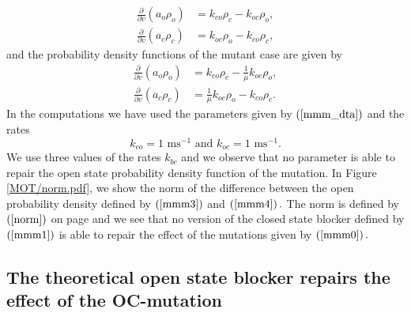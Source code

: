 \begin{align}
\frac{\partial}{\partial v}\left(  a_{o}\rho_{o}\right)   &  =k_{co}\rho
_{c}-k_{oc}\rho_{o},\label{mmm4}\\
\frac{\partial}{\partial v}\left(  a_{c}\rho_{c}\right)   &  =k_{oc}\rho
_{o}-k_{co}\rho_{c},\nonumber
\end{align}
and the probability density functions of the mutant case are given by
\begin{align}
\frac{\partial}{\partial v}\left(  a_{o}\rho_{o}\right)   &  =k_{co}\rho
_{c}-\frac{1}{\mu}k_{oc}\rho_{o},\label{mutant44}\\
\frac{\partial}{\partial v}\left(  a_{c}\rho_{c}\right)   &  =\frac{1}{\mu}k_{oc}\rho
_{o}-k_{co}\rho_{c}.\nonumber
\end{align}
In the computations we have used the parameters given by $\left(
\ref{mmm_dta}\right)  $ and the rates%
\[
k_{co}=1\text{ ms}^{-1} \text{ and }k_{oc}=1\text{ ms}^{-1}.
\]
We use three values of the rates $k_{bc}$ and we observe that no parameter is
able to repair the open state probability density function of the mutation. In
Figure \ref{MOT/norm.pdf}, we show the norm of the difference between the open probability
density defined by $\left(  \ref{mmm3}\right)  $ and $\left(  \ref{mmm4}%
\right)  .$ The norm is defined by $\left(  \ref{norm}\right)  $ on page
\pageref{norm} and we see that no version of the closed state blocker defined 
by $\left(  \ref{mmm1}\right)  $ is able to repair the effect of the mutations
given by $\left(  \ref{mmm0}\right)  .$




\subsection{The theoretical open state blocker repairs the effect of the OC-mutation}

